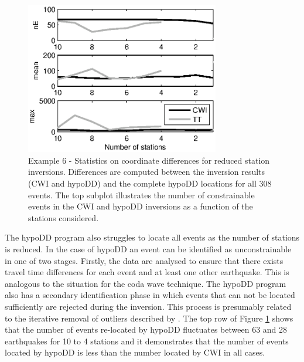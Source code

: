 \documentclass[extra]{gji}
\begin{document}

\begin{figure}
\noindent\includegraphics[width =
20pc]{diags/CalaverasLoc4_hypoDD_SVD.eps} \caption{Example 6 -
Statistics on coordinate differences for reduced station inversions.
Differences are computed between the inversion results (CWI and
hypoDD) and the complete hypoDD locations for all 308 events. The
top subplot illustrates the number of constrainable events in the
CWI and hypoDD inversions as a function of the stations considered.}
\label{fig-statremoval_summarystats}
\end{figure}


The hypoDD program also struggles to locate all events as the number
of stations is reduced. In the case of hypoDD an event can be
identified as unconstrainable in one of two stages. Firstly, the
data are analysed to ensure that there exists travel time
differences for each event and at least one other earthquake. This
is analogous to the situation for the coda wave technique. The
hypoDD program also has a secondary identification phase in which
events that can not be located sufficiently are rejected during the
inversion. This process is presumably related to the iterative
removal of outliers described by \citet{dr_Waldhauser00a}. The top
row of Figure \ref{fig-statremoval_summarystats} shows that the
number of events re-located by hypoDD fluctuates between 63 and 28
earthquakes for 10 to 4 stations and it demonstrates that the number
of events located by hypoDD is less than the number located by CWI
in all cases.
\end{document}
